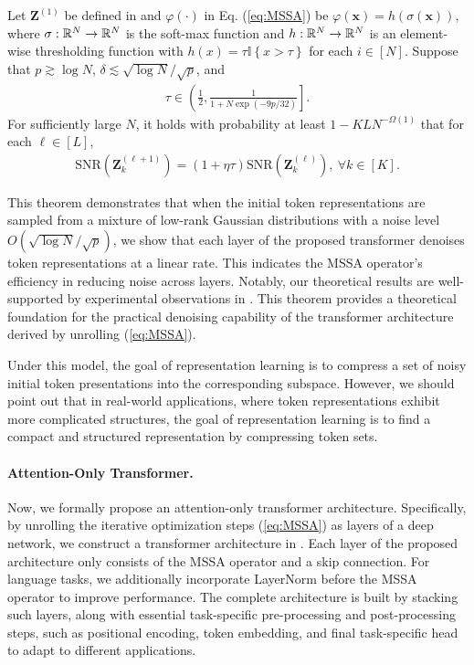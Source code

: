 \documentclass[\toplevelprefix/book-main.tex]{subfiles}
\begin{document}
\begin{theorem}\label{thm:1}
Let $\bm Z^{(1)}$ be defined in  and $\varphi(\cdot)$ in Eq. (\ref{eq:MSSA}) be 
$\varphi(\bm x) = h\left(\sigma(\bm x)\right)$,
where $\sigma:\mathbb{R}^N \to \mathbb{R}^N$ is the soft-max function and $h:\mathbb{R}^N \to \mathbb{R}^N$ is an element-wise thresholding function with $h(x) = \tau \mathbb{I}\left\{x > \tau\right\}$ for each $i \in [N]$. Suppose that $p \gtrsim \log N$, $\delta \lesssim \sqrt{\log N}/\sqrt{p}$, and 
\begin{align*}
\tau \in \left( \frac{1}{2},  \frac{1}{1+N\exp(-9p/32)} \right].
\end{align*}
For sufficiently large $N$, it holds with probability at least $1-KLN^{-\Omega(1)}$ that for each $\ell \in [L]$, 
    \begin{align}\label{eq:SNR}
        \mathrm{SNR}(\bm Z_k^{(\ell+1)}) = (1+\eta\tau) \mathrm{SNR}(\bm Z_k^{(\ell)}),\ \forall k \in [K]. 
    \end{align}
\end{theorem}
This theorem demonstrates that when the initial token representations are sampled from a mixture of low-rank Gaussian distributions with a noise level $O(\sqrt{\log N}/\sqrt{p})$, we show that each layer of the proposed transformer denoises token representations at a linear rate. This indicates the MSSA operator's efficiency in reducing noise across layers. Notably, our theoretical results are well-supported by experimental observations in . This theorem provides a theoretical foundation for the practical denoising capability of the transformer architecture derived by unrolling (\ref{eq:MSSA}). 

\begin{remark}
    Under this model, the goal of representation learning is to compress a set of noisy initial token presentations into the corresponding subspace. However, we should point out that in real-world applications, where token representations exhibit more complicated structures, the goal of representation learning is to find a compact and structured representation by compressing token sets. 
\end{remark}


\paragraph{Attention-Only Transformer.} Now, we formally propose an attention-only transformer architecture. Specifically, by unrolling the iterative optimization steps (\ref{eq:MSSA}) as layers of a deep network, we construct a transformer architecture in . Each layer of the proposed architecture only consists of the MSSA operator and a skip connection. For language tasks, we additionally incorporate LayerNorm before the MSSA operator to improve performance. The complete architecture is built by stacking such layers, along with essential task-specific pre-processing and post-processing steps, such as positional encoding, token embedding, and final task-specific head to adapt to different applications. 
\end{document}
